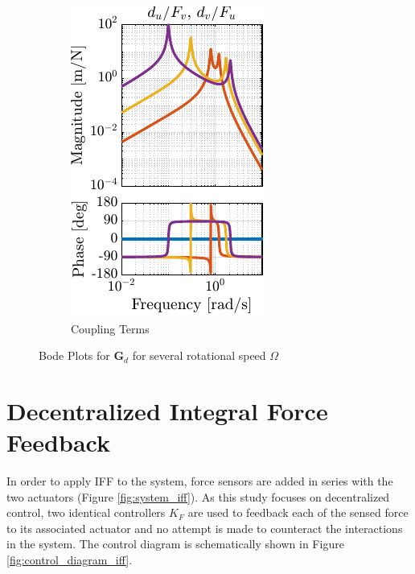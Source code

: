 \documentclass[10pt]{iopart}
\begin{document}
\begin{figure}[htbp]
\begin{subfigure}[c]{0.48\linewidth}
\includegraphics[width=\linewidth]{figs/fig03b.pdf}
\caption{\label{fig:plant_compare_rotating_speed_coupling} Coupling Terms}
\end{subfigure}
\hfill
\caption{\label{fig:plant_compare_rotating_speed}Bode Plots for \(\bm{G}_d\) for several rotational speed \(\Omega\)}
\centering
\end{figure}

\section{Decentralized Integral Force Feedback}
\label{sec:orgaa40c6a}
\label{sec:iff}
In order to apply IFF to the system, force sensors are added in series with the two actuators (Figure \ref{fig:system_iff}).
As this study focuses on decentralized control, two identical controllers \(K_F\) are used to feedback each of the sensed force to its associated actuator and no attempt is made to counteract the interactions in the system.
The control diagram is schematically shown in Figure \ref{fig:control_diagram_iff}.
\end{document}
